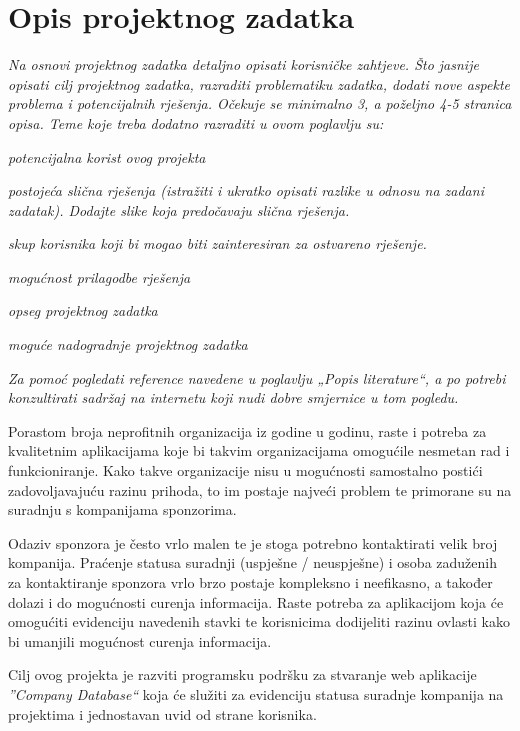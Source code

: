 \chapter{Opis projektnog zadatka}

\textit{Na osnovi projektnog zadatka detaljno opisati korisničke zahtjeve. Što jasnije opisati cilj projektnog zadatka, razraditi problematiku zadatka, dodati nove aspekte problema i potencijalnih rješenja. Očekuje se minimalno 3, a poželjno 4-5 stranica opisa.	Teme koje treba dodatno razraditi u ovom poglavlju su:}
		\begin{packed_item}
			\item \textit{potencijalna korist ovog projekta}
			\item \textit{postojeća slična rješenja (istražiti i ukratko opisati razlike u odnosu na zadani zadatak). Dodajte slike koja predočavaju slična rješenja.}
			\item \textit{skup korisnika koji bi mogao biti zainteresiran za ostvareno rješenje.}
			\item \textit{mogućnost prilagodbe rješenja }
			\item \textit{opseg projektnog zadatka}
			\item \textit{moguće nadogradnje projektnog zadatka}
		\end{packed_item}
		
		\textit{Za pomoć pogledati reference navedene u poglavlju „Popis literature“, a po potrebi konzultirati sadržaj na internetu koji nudi dobre smjernice u tom pogledu.}\vspace{0.5cm}
		
		{Porastom broja neprofitnih organizacija iz godine u godinu, raste i potreba za kvalitetnim aplikacijama koje bi takvim organizacijama omogućile nesmetan rad i funkcioniranje. Kako takve organizacije nisu u mogućnosti samostalno postići zadovoljavajuću razinu prihoda, to im postaje najveći problem te primorane su na suradnju s kompanijama sponzorima.}

		{Odaziv sponzora je često vrlo malen te je stoga potrebno kontaktirati velik broj kompanija. Praćenje statusa suradnji (uspješne / neuspješne) i osoba zaduženih za kontaktiranje sponzora vrlo brzo postaje kompleksno i neefikasno, a također dolazi i do mogućnosti curenja informacija. Raste potreba za aplikacijom koja će omogućiti evidenciju navedenih stavki te korisnicima dodijeliti razinu ovlasti kako bi umanjili mogućnost curenja informacija.}

		{Cilj ovog projekta je razviti programsku podršku za stvaranje web aplikacije \textit{”Company Database“} koja će služiti za evidenciju statusa suradnje kompanija na projektima i jednostavan uvid od strane  korisnika.}\vspace{0.2cm}
		

